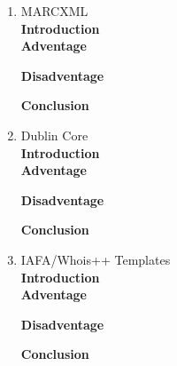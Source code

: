 \begin{enumerate}
	{\bf Adventage}\\
	\begin{enumerate}
		
	\end{enumerate}	
	{\bf Disadventage}\\
	\begin{enumerate}
		
	\end{enumerate}
	{\bf Conclusion}\\
	
	\item MARCXML\\
	{\bf Introduction}\\
	
	{\bf Adventage}\\
	\begin{enumerate}
		
	\end{enumerate}	
	{\bf Disadventage}\\
	\begin{enumerate}
		
	\end{enumerate}
	{\bf Conclusion}\\
	
	\item Dublin Core\\
	{\bf Introduction}\\
	
	{\bf Adventage}\\
	\begin{enumerate}
		
	\end{enumerate}	
	{\bf Disadventage}\\
	\begin{enumerate}
		
	\end{enumerate}
	{\bf Conclusion}\\
	
	\item IAFA/Whois++ Templates\\
	{\bf Introduction}\\
	
	{\bf Adventage}\\
	\begin{enumerate}
		
	\end{enumerate}	
	{\bf Disadventage}\\
	\begin{enumerate}
		
	\end{enumerate}
	{\bf Conclusion}\\	

\end{enumerate}


